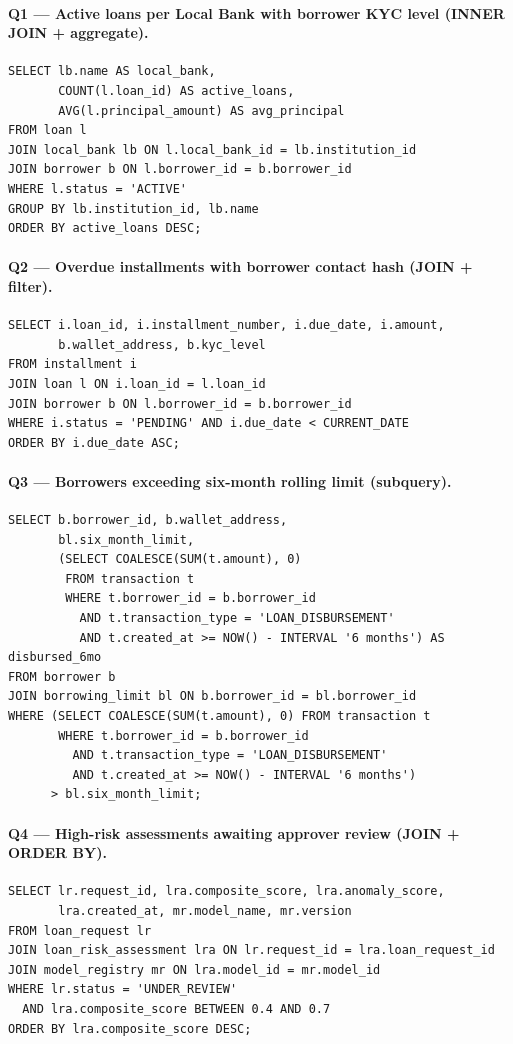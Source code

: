 \documentclass[12pt,a4paper]{report}
\begin{document}
\paragraph{Q1 --- Active loans per Local Bank with borrower KYC level (INNER JOIN + aggregate).}
\begin{verbatim}
SELECT lb.name AS local_bank,
       COUNT(l.loan_id) AS active_loans,
       AVG(l.principal_amount) AS avg_principal
FROM loan l
JOIN local_bank lb ON l.local_bank_id = lb.institution_id
JOIN borrower b ON l.borrower_id = b.borrower_id
WHERE l.status = 'ACTIVE'
GROUP BY lb.institution_id, lb.name
ORDER BY active_loans DESC;
\end{verbatim}

\paragraph{Q2 --- Overdue installments with borrower contact hash (JOIN + filter).}
\begin{verbatim}
SELECT i.loan_id, i.installment_number, i.due_date, i.amount,
       b.wallet_address, b.kyc_level
FROM installment i
JOIN loan l ON i.loan_id = l.loan_id
JOIN borrower b ON l.borrower_id = b.borrower_id
WHERE i.status = 'PENDING' AND i.due_date < CURRENT_DATE
ORDER BY i.due_date ASC;
\end{verbatim}

\paragraph{Q3 --- Borrowers exceeding six-month rolling limit (subquery).}
\begin{verbatim}
SELECT b.borrower_id, b.wallet_address,
       bl.six_month_limit,
       (SELECT COALESCE(SUM(t.amount), 0)
        FROM transaction t
        WHERE t.borrower_id = b.borrower_id
          AND t.transaction_type = 'LOAN_DISBURSEMENT'
          AND t.created_at >= NOW() - INTERVAL '6 months') AS disbursed_6mo
FROM borrower b
JOIN borrowing_limit bl ON b.borrower_id = bl.borrower_id
WHERE (SELECT COALESCE(SUM(t.amount), 0) FROM transaction t
       WHERE t.borrower_id = b.borrower_id
         AND t.transaction_type = 'LOAN_DISBURSEMENT'
         AND t.created_at >= NOW() - INTERVAL '6 months')
      > bl.six_month_limit;
\end{verbatim}

\paragraph{Q4 --- High-risk assessments awaiting approver review (JOIN + ORDER BY).}
\begin{verbatim}
SELECT lr.request_id, lra.composite_score, lra.anomaly_score,
       lra.created_at, mr.model_name, mr.version
FROM loan_request lr
JOIN loan_risk_assessment lra ON lr.request_id = lra.loan_request_id
JOIN model_registry mr ON lra.model_id = mr.model_id
WHERE lr.status = 'UNDER_REVIEW'
  AND lra.composite_score BETWEEN 0.4 AND 0.7
ORDER BY lra.composite_score DESC;
\end{verbatim}
\end{document}
